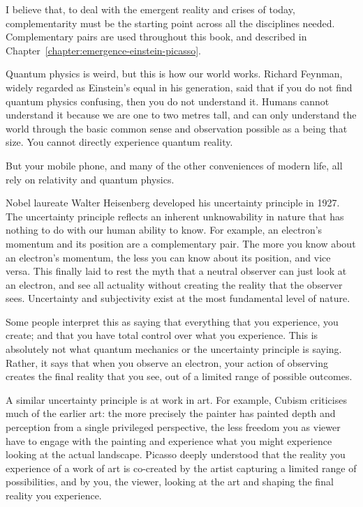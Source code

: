 I believe that, to deal with the emergent reality and crises of today, complementarity must be the starting point across all the disciplines needed. Complementary pairs are used throughout this book, and described in Chapter~\ref{chapter:emergence-einstein-picasso}.


Quantum physics is weird, but this is how our world works. Richard Feynman, widely regarded as Einstein's equal in his generation, said that if you do not find quantum physics confusing, then you do not understand it. Humans cannot understand it because we are one to two metres tall, and can only understand the world through the basic common sense and observation possible as a being that size. You cannot directly experience quantum reality. 


But your mobile phone, and many of the other conveniences of modern life, all rely on relativity and quantum physics.


Nobel laureate Walter Heisenberg developed his uncertainty principle in 1927. The uncertainty principle reflects an inherent unknowability in nature that has nothing to do with our human ability to know. For example, an electron’s momentum and its position are a complementary pair. The more you know about an electron's momentum, the less you can know about its position, and vice versa. This finally laid to rest the myth that a neutral observer can just look at an electron, and see all actuality without creating the reality that the observer sees. Uncertainty and subjectivity exist at the most fundamental level of nature.


Some people interpret this as saying that everything that you experience, you create; and that you have total control over what you experience. This is absolutely not what quantum mechanics or the uncertainty principle is saying. Rather, it says that when you observe an electron, your action of observing creates the final reality that you see, out of a limited range of possible outcomes. 


A similar uncertainty principle is at work in art. For example, Cubism criticises much of the earlier art: the more precisely the painter has painted depth and perception from a single privileged perspective, the less freedom you as viewer have to engage with the painting and experience what you might experience looking at the actual landscape. Picasso deeply understood that the reality you experience of a work of art is co-created by the artist capturing a limited range of possibilities, and by you, the viewer, looking at the art and shaping the final reality you experience.


